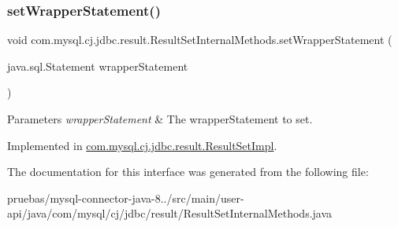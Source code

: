 \mbox{\label{interfacecom_1_1mysql_1_1cj_1_1jdbc_1_1result_1_1_result_set_internal_methods_aeaa719d2c55d3e0c32bd5b47b4020009}} 
\subsubsection{\texorpdfstring{set\+Wrapper\+Statement()}{setWrapperStatement()}}
{\footnotesize\ttfamily void com.\+mysql.\+cj.\+jdbc.\+result.\+Result\+Set\+Internal\+Methods.\+set\+Wrapper\+Statement (\begin{DoxyParamCaption}\item[{java.\+sql.\+Statement}]{wrapper\+Statement }\end{DoxyParamCaption})}


\begin{DoxyParams}{Parameters}
{\em wrapper\+Statement} & The wrapper\+Statement to set. \\
\hline
\end{DoxyParams}


Implemented in \mbox{\hyperlink{classcom_1_1mysql_1_1cj_1_1jdbc_1_1result_1_1_result_set_impl_a554db0f910df92f690ce667a5e5b5000}{com.\+mysql.\+cj.\+jdbc.\+result.\+Result\+Set\+Impl}}.



The documentation for this interface was generated from the following file\+:\begin{DoxyCompactItemize}
\item 
pruebas/mysql-\/connector-\/java-\/8../src/main/user-\/api/java/com/mysql/cj/jdbc/result/Result\+Set\+Internal\+Methods.\+java\end{DoxyCompactItemize}
